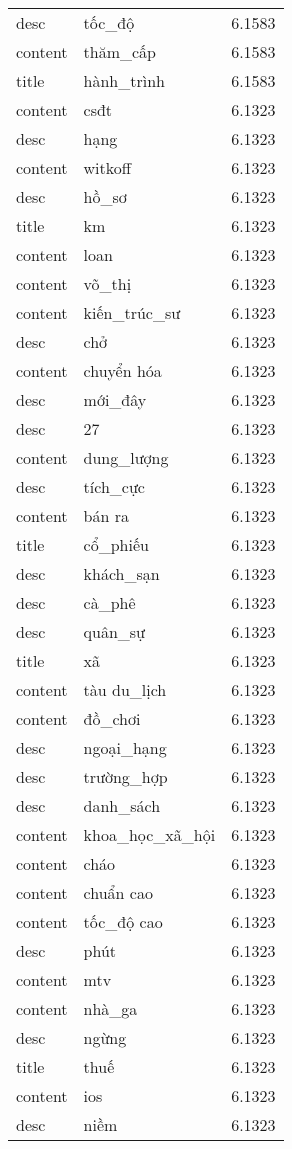 \documentclass{article}
\begin{document}
\begin{tabular}{lll}
desc & tốc\_độ & 6.1583\\
content & thăm\_cấp & 6.1583\\
title & hành\_trình & 6.1583\\
content & csđt & 6.1323\\
desc & hạng & 6.1323\\
content & witkoff & 6.1323\\
desc & hồ\_sơ & 6.1323\\
title & km & 6.1323\\
content & loan & 6.1323\\
content & võ\_thị & 6.1323\\
content & kiến\_trúc\_sư & 6.1323\\
desc & chở & 6.1323\\
content & chuyển hóa & 6.1323\\
desc & mới\_đây & 6.1323\\
desc & 27 & 6.1323\\
content & dung\_lượng & 6.1323\\
desc & tích\_cực & 6.1323\\
content & bán ra & 6.1323\\
title & cổ\_phiếu & 6.1323\\
desc & khách\_sạn & 6.1323\\
desc & cà\_phê & 6.1323\\
desc & quân\_sự & 6.1323\\
title & xã & 6.1323\\
content & tàu du\_lịch & 6.1323\\
content & đồ\_chơi & 6.1323\\
desc & ngoại\_hạng & 6.1323\\
desc & trường\_hợp & 6.1323\\
desc & danh\_sách & 6.1323\\
content & khoa\_học\_xã\_hội & 6.1323\\
content & cháo & 6.1323\\
content & chuẩn cao & 6.1323\\
content & tốc\_độ cao & 6.1323\\
desc & phút & 6.1323\\
content & mtv & 6.1323\\
content & nhà\_ga & 6.1323\\
desc & ngừng & 6.1323\\
title & thuế & 6.1323\\
content & ios & 6.1323\\
desc & niềm & 6.1323\\

\end{tabular}
\end{document}
